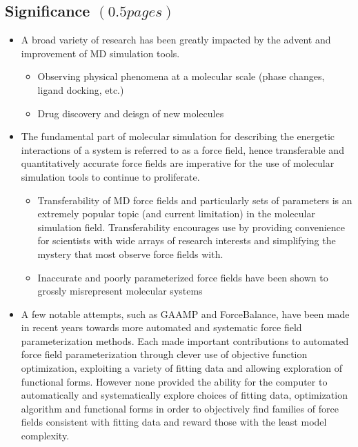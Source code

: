 \documentclass[aps,pre,onecolumn,nofootinbib,superscriptaddress,linenumbers,12pt, draft,tightenlines]{revtex4-1}
\begin{document}
\subsection{Significance $\left(0.5 pages\right)$}
\begin{itemize}
 \item A broad variety of research has been greatly impacted by the advent and improvement of MD simulation tools.  
  \begin{itemize}
   \item Observing physical phenomena at a molecular scale (phase changes, ligand docking, etc.)\cite{villin}
   \item Drug discovery and deisgn of new molecules\cite{drug_discov}
  \end{itemize}
 \item The fundamental part of molecular simulation for describing the energetic interactions of a system is referred to as a force field, hence transferable and quantitatively accurate force fields are imperative for the use of molecular simulation tools to continue to proliferate.
  \begin{itemize}
   \item Transferability of MD force fields and particularly sets of parameters is an extremely popular topic (and current limitation) in the molecular simulation field.\cite{transferability1,transferability2,transferability3,transferability4} Transferability encourages use by providing convenience for scientists with wide arrays of research interests and simplifying the mystery that most observe force fields with.
   \item Inaccurate and poorly parameterized force fields have been shown to grossly misrepresent molecular systems\cite{ffcomp1,ffcomp2}
  \end{itemize}
 \item A few notable attempts, such as GAAMP and ForceBalance, have been made in recent years towards more automated and systematic force field parameterization methods.\cite{GAAMP,FB1,FB2,FB3} Each made important contributions to automated force field parameterization through clever use of objective function optimization, exploiting a variety of fitting data and allowing exploration of functional forms. However none provided the ability for the computer to automatically and systematically explore choices of fitting data, optimization algorithm and functional forms in order to objectively find families of force fields consistent with fitting data and reward those with the least model complexity.  
\end{itemize}
\end{document}
